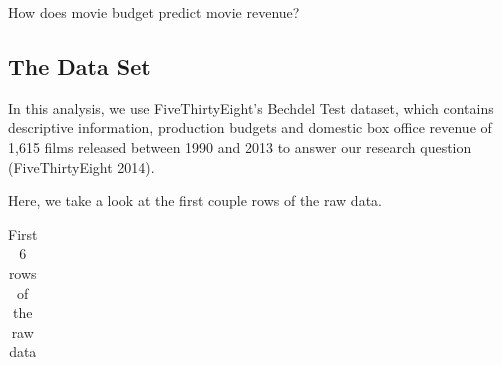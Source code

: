 \documentclass[
  letterpaper,
  DIV=11,
  numbers=noendperiod]{scrartcl}
\begin{document}
How does movie budget predict movie revenue?

\subsection{The Data Set}\label{the-data-set}

In this analysis, we use FiveThirtyEight's Bechdel Test dataset, which
contains descriptive information, production budgets and domestic box
office revenue of 1,615 films released between 1990 and 2013 to answer
our research question (FiveThirtyEight 2014).

Here, we take a look at the first couple rows of the raw data.

\begin{longtable}[]{@{}
  >{\raggedleft\arraybackslash}p{}
  >{\raggedright\arraybackslash}p{}
  >{\raggedright\arraybackslash}p{}
  >{\raggedright\arraybackslash}p{}
  >{\raggedright\arraybackslash}p{}
  >{\raggedright\arraybackslash}p{}
  >{\raggedleft\arraybackslash}p{}
  >{\raggedright\arraybackslash}p{}
  >{\raggedright\arraybackslash}p{}
  >{\raggedright\arraybackslash}p{}
  >{\raggedleft\arraybackslash}p{}
  >{\raggedright\arraybackslash}p{}
  >{\raggedright\arraybackslash}p{}
  >{\raggedleft\arraybackslash}p{}
  >{\raggedleft\arraybackslash}p{}@{}}

\caption{\label{tbl-movie-data-raw}First 6 rows of the raw data}

\tabularnewline


\end{longtable}
\end{document}
